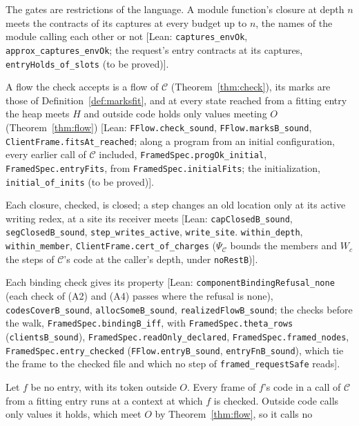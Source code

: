 \documentclass[10pt,a4paper]{article}
\theoremstyle{definition}
\theoremstyle{remark}
\newcommand{\lean}[1]{\texttt{\small #1}}
\newcommand{\status}[1]{\textsf{\small[#1]}}
\newcommand{\cC}{\mathcal{C}}
\begin{document}
\begin{description}[leftmargin=1.5em,style=nextline]
\item[(A1)] The gates are restrictions of the language. A module
function's closure at depth $n$ meets the contracts of its captures at
every budget up to $n$, the names of the module calling each other or not
\status{Lean: \lean{captures\_envOk}, \lean{approx\_captures\_envOk}; the request's entry contracts at its captures, \lean{entryHolds\_of\_slots} (to be proved)}.
\item[(A2)] A flow the check accepts is a flow of $\cC$
(Theorem~\ref{thm:check}), its marks are those of
Definition~\ref{def:marksfit}, and at every state reached from a fitting
entry the heap meets $H$ and outside code holds only values meeting $O$
(Theorem~\ref{thm:flow})
\status{Lean: \lean{FFlow.check\_sound}, \lean{FFlow.marksB\_sound}, \lean{ClientFrame.fitsAt\_reached}; along a program from an initial configuration, every earlier call of $\cC$ included, \lean{FramedSpec.progOk\_initial}, \lean{FramedSpec.entryFits}, from \lean{FramedSpec.initialFits}; the initialization, \lean{initial\_of\_inits} (to be proved)}.
\item[(A3)] Each closure, checked, is closed; a step changes an old
location only at its active writing redex, at a site its receiver meets
\status{Lean: \lean{capClosedB\_sound}, \lean{segClosedB\_sound}, \lean{step\_writes\_active}, \lean{write\_site}. \lean{within\_depth}, \lean{within\_member}, \lean{ClientFrame.cert\_of\_charges} ($\Psi_\cC$ bounds the members and $W_c$ the steps of $\cC$'s code at the caller's depth, under \lean{noRestB})}.
\item[(A4), (B4)] Each binding check gives its property
\status{Lean: \lean{componentBindingRefusal\_none} (each check of (A2) and (A4) passes where the refusal is none), \lean{codesCoverB\_sound}, \lean{allocSomeB\_sound}, \lean{realizedFlowB\_sound}; the checks before the walk, \lean{FramedSpec.bindingB\_iff}, with \lean{FramedSpec.theta\_rows} (\lean{clientsB\_sound}), \lean{FramedSpec.readOnly\_declared}, \lean{FramedSpec.framed\_nodes}, \lean{FramedSpec.entry\_checked} (\lean{FFlow.entryB\_sound}, \lean{entryFnB\_sound}), which tie the frame to the checked file and which no step of \lean{framed\_requestSafe} reads}.
\item[(B1), (B4) at known calls] Let $f$ be no entry, with its token
outside $O$. Every frame of $f$'s code in a call of $\cC$ from a fitting
entry runs at a context at which $f$ is checked. Outside code calls only
values it holds, which meet $O$ by Theorem~\ref{thm:flow}, so it calls no

\end{description}
\end{document}
